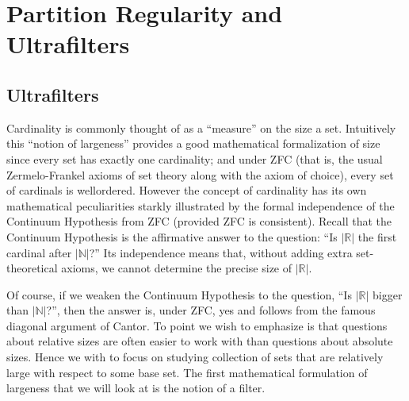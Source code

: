 \documentclass[12pt]{article}
\theoremstyle{plain}
\theoremstyle{definition}
\newcommand{\bbN}{\mathbb{N}}
\newcommand{\bbR}{\mathbb{R}}
\begin{document}
\section{Partition Regularity and Ultrafilters}

\subsection{Ultrafilters}
Cardinality is commonly thought of as a ``measure'' on 
the size a set.
Intuitively this ``notion of largeness'' provides a good mathematical
formalization of size since every set has exactly one cardinality;
and under ZFC (that is, the usual Zermelo-Frankel axioms of set
theory along with the axiom of choice), every set of cardinals is
wellordered.
However the concept of cardinality has its own mathematical
peculiarities starkly illustrated by the formal independence of the
Continuum Hypothesis from ZFC (provided ZFC is consistent). 
Recall that the Continuum Hypothesis is the affirmative answer to the
question: ``Is $|\bbR|$ the first cardinal after $|\bbN|$?''
Its independence means that, without adding extra set-theoretical axioms,
we cannot determine the precise size of $|\bbR|$.%

%
Of course, if we weaken the Continuum Hypothesis to the question, ``Is
$|\bbR|$ bigger than $|\bbN|$?'', then the answer is, under ZFC, yes and
follows from the famous diagonal argument of Cantor. 
To point we wish to emphasize is that questions about relative sizes are
often easier to work with than questions about absolute sizes. 
Hence we with to focus on studying collection of sets that are
relatively large with respect to some base set.
%
The first mathematical formulation of largeness that we will look at is
the notion of a filter. 
\end{document}

